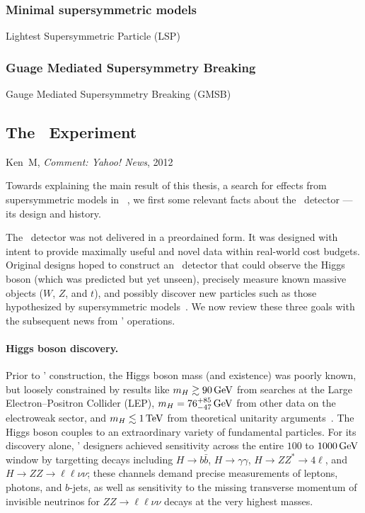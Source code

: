 \subsubsection{Minimal supersymmetric models}
Lightest Supersymmetric Particle (LSP)


\subsubsection{Guage Mediated Supersymmetry Breaking}
Gauge Mediated Supersymmetry Breaking (GMSB)



\begin{singlespacing}
\section{The \atlas\ Experiment}
%
\begin{epigraphs}
%
{Ken~M,
\textit{Comment: Yahoo! News},
2012~\cite{kenm2012inner}}
\end{epigraphs}
\end{singlespacing}

Towards explaining the main result of this thesis,
a search for effects from supersymmetric models in
\atlas~\cite{atlas2022searches},
we first some relevant facts about the \atlas\ detector ---
its design and history.

The \atlas\ detector was not delivered in a preordained form.
It was designed with intent to provide maximally useful and novel data within
real-world cost budgets.
Original designs hoped to construct an \atlas\ detector that could
observe the Higgs boson (which was predicted but yet unseen),
precisely measure known massive objects ($W$, $Z$, and $t$),
and possibly discover new particles such as those hypothesized by
supersymmetric models~\cite{atlas1999design1}.
We now review these three goals with the subsequent news from \atlas'
operations.

\paragraph{Higgs boson discovery.}
Prior to \atlas' construction, the Higgs boson mass (and existence) was
poorly known, but loosely constrained by results like
$m_H \gtrsim 90\,\eV[G]$ from searches at the
Large Electron–Positron Collider (LEP),
$m_H = 76^{+85}_{-47}\,\eV[G]$ from other data on the electroweak sector,
and $m_H \lesssim 1\,\eV[T]$ from theoretical unitarity arguments~\cite{
atlas1999design2,
ghinculov1998perturb,
lep1999ewk
}.
The Higgs boson couples to an extraordinary variety of fundamental particles.
For its discovery alone, \atlas' designers achieved sensitivity across the
entire $100$ to $1000\,\eV[G]$ window by targetting decays including
$H\to b\bar b$,
$H\to \gamma\gamma$,
$H\to ZZ^* \to 4\ell$, and
$H\to ZZ \to \ell\ell\nu\nu$;
these channels demand precise measurements of leptons, photons, and
$b$-jets, as well as sensitivity to the missing transverse momentum of
invisible neutrinos for $ZZ \to \ell\ell\nu\nu$ decays at the very highest
masses.

